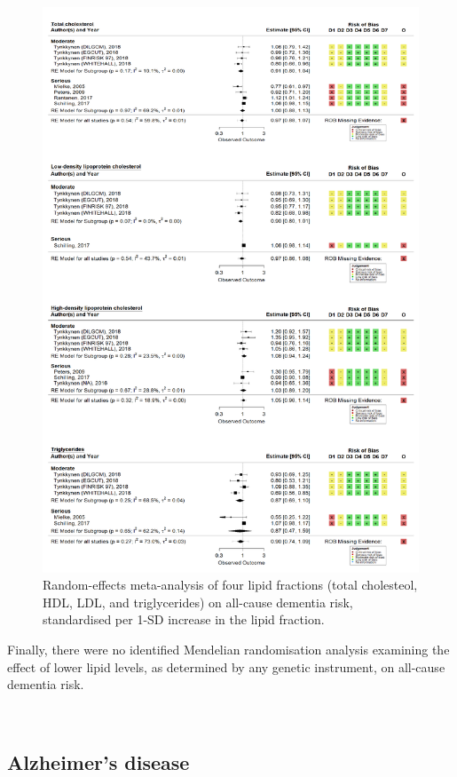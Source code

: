 \documentclass[a4paper, twoside]{templates/ociamthesis}
\begin{document}
\begin{figure}[H]
\includegraphics[width=1\linewidth]{figures/sys-rev/fp_lipids_composite_Dementia} \caption[Random-effects meta-analysis of four lipid fractions on all-cause dementia]{Random-effects meta-analysis of four lipid fractions (total cholesteol, HDL, LDL, and triglycerides) on all-cause dementia risk, standardised per 1-SD increase in the lipid fraction.}\label{fig:lipidFractionsDementia}
\end{figure}

Finally, there were no identified Mendelian randomisation analysis examining the effect of lower lipid levels, as determined by any genetic instrument, on all-cause dementia risk.

~

\hypertarget{sys-rev-res-AD}{%
\subsection{Alzheimer's disease}\label{sys-rev-res-AD}}
\end{document}

